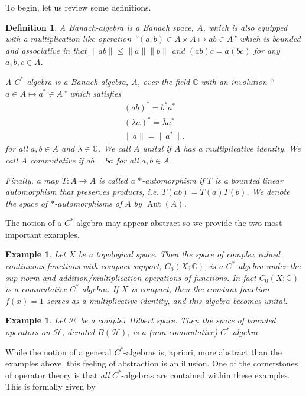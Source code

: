 \documentclass[12pt]{amsart}
\newtheorem{defn}[thm]{Definition}
\newtheorem{example}[thm]{Example}
\begin{document}
To begin, let us review some definitions.
\begin{defn}
	A \emph{Banach-algebra} is a Banach space, $A$, which is also equipped with a multiplication-like operation ``$(a,b) \in A \times A \mapsto ab \in A$''
	which is bounded and associative in that $\| ab \| \leq \|a \| \|b \|$ and $(ab)c = a(bc)$ for any $a,b,c \in A$.
	
	A \emph{$C^{*}$-algebra} is a Banach algebra, $A$, over the field $\mathbb{C}$ with an involution ``$a \in A \mapsto a^{*} \in A$'' which satisfies
	\begin{align}
		(ab)^{*} = b^{*} a^{*} \\
		(\lambda a)^{*} = \bar{\lambda} a^{*} \\
		\| a \| = \| a^{*}\|.
	\end{align}
	for all $a,b \in A$ and $\lambda \in \mathbb{C}$.
	We call $A$ \emph{unital} if $A$ has a multiplicative identity.
	We call $A$ commutative if $ab = ba$ for all $a,b \in A$.
	
	Finally, a map $T:A \to A$ is called a $*$-automorphism if $T$ is a bounded linear automorphism that preserves products, i.e. $T(ab) = T(a) T(b)$.
	We denote the space of $*$-automorphisms of $A$ by $\operatorname{Aut}(A)$.
\end{defn}

The notion of a $C^{*}$-algebra may appear abstract so we provide the two most important examples.

\begin{example} \label{ex:function algebra}
	Let $X$ be a topological space.  Then the space of complex valued continuous functions with compact support, $C_{0}(X;\mathbb{C})$, is a $C^{*}$-algebra under the sup-norm and addition/multiplication operations of functions.
	In fact $C_{0}(X;\mathbb{C})$ is a commutative $C^{*}$-algebra.  If $X$ is compact, then the constant function $f(x) = 1$ serves as a multiplicative identity, and this algebra becomes unital.
\end{example}

\begin{example}
	Let $\mathcal{H}$ be a complex Hilbert space. Then the space of bounded operators on $\mathcal{H}$, denoted $B(\mathcal{H})$, is a (non-commutative) $C^{*}$-algebra.
\end{example}

While the notion of a general $C^{*}$-algebras is, apriori, more abstract than the examples above, this feeling of abstraction is an illusion.
One of the cornerstones of operator theory is that \emph{all} $C^{*}$-algebras are contained within these examples.
This is formally given by
\end{document}
